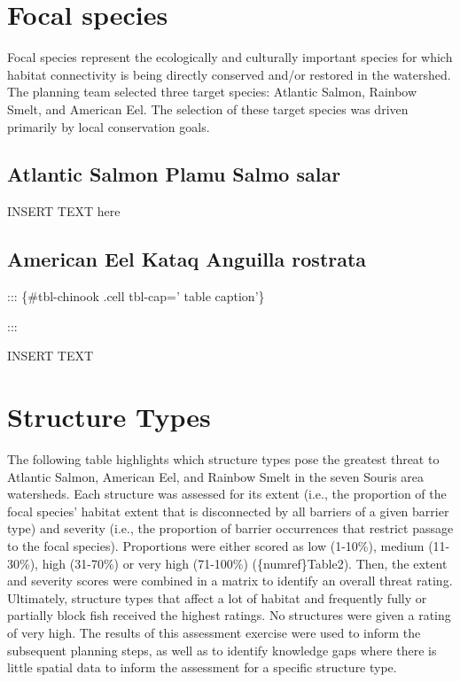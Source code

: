 \documentclass[
  letterpaper,
  DIV=11,
  numbers=noendperiod]{scrreprt}
\begin{document}
\section*{Focal species}\label{focal-species}


Focal species represent the ecologically and culturally important
species for which habitat connectivity is being directly conserved
and/or restored in the watershed. The planning team selected three
target species: Atlantic Salmon, Rainbow Smelt, and American Eel. The
selection of these target species was driven primarily by local
conservation goals.

\subsection*{Atlantic Salmon \textbar{} Plamu \textbar{} Salmo
salar}\label{atlantic-salmon-plamu-salmo-salar}

INSERT TEXT here

\subsection*{American Eel \textbar{} Kataq \textbar{} Anguilla
rostrata}\label{american-eel-kataq-anguilla-rostrata}

::: \{\#tbl-chinook .cell tbl-cap=' table caption'\}

:::

INSERT TEXT

\section*{Structure Types}\label{structure-types}


The following table highlights which structure types pose the greatest
threat to Atlantic Salmon, American Eel, and Rainbow Smelt in the seven
Souris area watersheds. Each structure was assessed for its extent
(i.e., the proportion of the focal species' habitat extent that is
disconnected by all barriers of a given barrier type) and severity
(i.e., the proportion of barrier occurrences that restrict passage to
the focal species). Proportions were either scored as low (1-10\%),
medium (11-30\%), high (31-70\%) or very high (71-100\%)
(\{numref\}Table2). Then, the extent and severity scores were combined
in a matrix to identify an overall threat rating. Ultimately, structure
types that affect a lot of habitat and frequently fully or partially
block fish received the highest ratings. No structures were given a
rating of very high. The results of this assessment exercise were used
to inform the subsequent planning steps, as well as to identify
knowledge gaps where there is little spatial data to inform the
assessment for a specific structure type.
\end{document}
